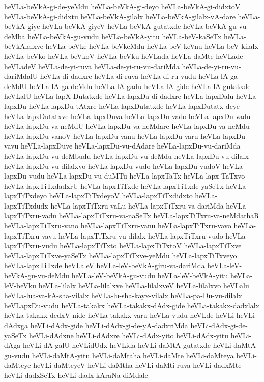 {heVLa-beVkA-gi-de-yeMdu
heVLa-beVkA-gi-deyo
heVLa-beVkA-gi-didxtoV
heVLa-beVkA-gi-didxtu
heVLa-beVkA-gilalx
heVLa-beVkA-gilalx-vA-dare
heVLa-beVkA-giye
heVLa-beVkA-giyeV
heVLa-beVkA-gutatxde
heVLa-beVkA-gu-vu-deMba
heVLa-beVkA-gu-vudu
heVLa-beVkA-yitu
heVLa-beV-kaSeTx
heVLa-beVkAlalxve
heVLa-beVke
heVLa-beVkeMdu
heVLa-beV-keVnu
heVLa-beV-kilalx
heVLa-beVko
heVLa-beVkoV
heVLa-beVku
heVLada
heVLa-daMte
heVLade
heVLadeV
heVLa-de-yi-ruva
heVLa-de-yi-ru-vu-dariMda
heVLa-de-yi-ru-vu-dariMdalU
heVLa-di-dadxre
heVLa-di-ruva
heVLa-di-ru-vudu
heVLa-lA-ga-deMdU
heVLa-lA-ga-deMdu
heVLa-lA-gadu
heVLa-lA-gide
heVLa-lA-gutatxde
heVLalU
heVLa-lapX-Dutatxde
heVLa-lapxDa-di-dadxre
heVLa-lapxDalu
heVLa-lapxDu
heVLa-lapxDu-tAtxre
heVLa-lapxDutatxde
heVLa-lapxDutatx-deye
heVLa-lapxDutatxve
heVLa-lapxDuva
heVLa-lapxDu-vado
heVLa-lapxDu-vadu
heVLa-lapxDu-va-neMdU
heVLa-lapxDu-va-neMdare
heVLa-lapxDu-va-neMdu
heVLa-lapxDu-vanoV
heVLa-lapxDu-vanu
heVLa-lapxDu-varu
heVLa-lapxDu-vavu
heVLa-lapxDuve
heVLa-lapxDu-vu-dAdare
heVLa-lapxDu-vu-dariMda
heVLa-lapxDu-vu-deMbudu
heVLa-lapxDu-vu-deMdu
heVLa-lapxDu-vu-dilalx
heVLa-lapxDu-vu-dilalxvo
heVLa-lapxDu-vudo
heVLa-lapxDu-vudoV
heVLa-lapxDu-vudu
heVLa-lapxDu-vu-duMTu
heVLa-lapxTaTx
heVLa-lapx-TaTxvo
heVLa-lapxTiTxdadxrU
heVLa-lapxTiTxde
heVLa-lapxTiTxde-yaSeTx
heVLa-lapxTiTxdeyo
heVLa-lapxTiTxdeyoV
heVLa-lapxTiTxdidxto
heVLa-lapxTiTxdudx
heVLa-lapxTiTxru-vaLu
heVLa-lapxTiTxru-va-dariMda
heVLa-lapxTiTxru-vadu
heVLa-lapxTiTxru-va-naSeTx
heVLa-lapxTiTxru-va-neMdathaR
heVLa-lapxTiTxru-vano
heVLa-lapxTiTxru-vanu
heVLa-lapxTiTxru-vavo
heVLa-lapxTiTxru-vavu
heVLa-lapxTiTxru-vu-dilalx
heVLa-lapxTiTxru-vudo
heVLa-lapxTiTxru-vudu
heVLa-lapxTiTxto
heVLa-lapxTiTxtoV
heVLa-lapxTiTxve
heVLa-lapxTiTxve-yaSeTx
heVLa-lapxTiTxve-yeMdu
heVLa-lapxTiTxveyo
heVLa-lapxTiTxde
heVLaleV
heVLa-leV-beVkA-giru-va-dariMda
heVLa-leV-beVkA-gu-vu-deMdu
heVLa-leV-beVkA-gu-vudu
heVLa-leV-beVkA-yitu
heVLa-leV-beVku
heVLa-lilalx
heVLa-lilalxve
heVLa-lilalxveV
heVLa-lilalxvo
heVLalu
heVLa-lua-va-kA-sha-vilalx
heVLa-lu-sha-kayx-vilalx
heVLa-pa-Du-vu-dilalx
heVLapxDu-vudu
heVLa-takakx
heVLa-takakx-dAdx-gide
heVLa-takakx-dadxlalx
heVLa-takakx-dedxV-nide
heVLa-takakx-varu
heVLa-vudu
heVLde
heVLi
heVLi-dAdxga
heVLi-dAdx-gide
heVLi-dAdx-gi-de-yA-dadxriMda
heVLi-dAdx-gi-de-yaSeTx
heVLi-dAdxne
heVLi-dAdxre
heVLi-dAdx-yito
heVLi-dAdx-yitu
heVLi-dAga
heVLi-dA-galU
heVLidUdx
heVLida
heVLi-daMtA-gutatxde
heVLi-daMtA-gu-vudu
heVLi-daMtA-yitu
heVLi-daMtaha
heVLi-daMte
heVLi-daMteya
heVLi-daMteye
heVLi-daMteyeV
heVLi-daMtha
heVLi-daMti-ruva
heVLi-dadxMte
heVLi-dadxSeTx
heVLi-dadx-kAraNa-diMdale
}
